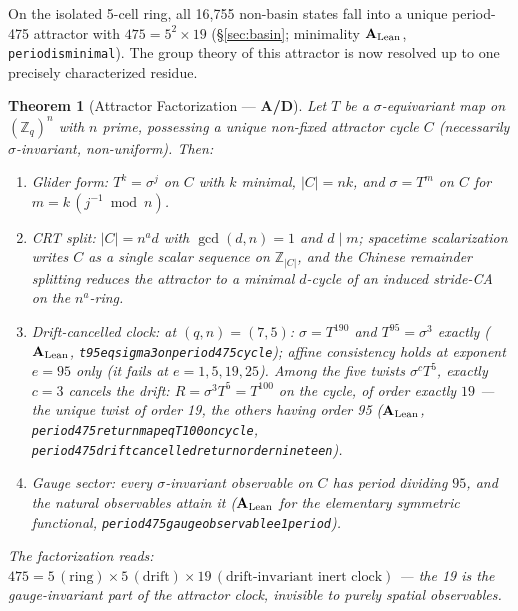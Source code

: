 \documentclass[11pt]{article}
\newtheorem{theorem}{Theorem}[section]
\theoremstyle{remark}
\newcommand{\lean}[1]{%
  \penalty-100
  \begingroup\def\_{\textunderscore\allowbreak}\texttt{#1}\endgroup}
\newcommand{\CatAL}{\texorpdfstring{\ensuremath{\textbf{A}_{\rm Lean}}}{A-Lean}}
\newcommand{\CatAD}{\textbf{A/D}}
\begin{document}
On the isolated 5-cell ring, all 16{,}755 non-basin states fall into a
unique period-475 attractor with $475 = 5^2 \times 19$
(§\ref{sec:basin}; minimality \CatAL{}, \lean{period\_475\_is\_minimal}).
The group theory of this attractor is now resolved up to one precisely
characterized residue.

\begin{theorem}[Attractor Factorization --- \CatAD{}]
\label{thm:attractorfactorization}
Let $T$ be a $\sigma$-equivariant map on $(\mathbb{Z}_q)^n$ with $n$
prime, possessing a unique non-fixed attractor cycle $C$ (necessarily
$\sigma$-invariant, non-uniform). Then:
\begin{enumerate}[leftmargin=2em,itemsep=2pt,topsep=2pt,label=(\roman*)]
  \item \emph{Glider form:} $T^k = \sigma^j$ on $C$ with $k$ minimal,
    $|C| = nk$, and $\sigma = T^{m}$ on $C$ for $m = k\,(j^{-1} \bmod n)$.
  \item \emph{CRT split:} $|C| = n^a d$ with $\gcd(d, n) = 1$ and
    $d \mid m$; spacetime scalarization writes $C$ as a single scalar
    sequence on $\mathbb{Z}_{|C|}$, and the Chinese remainder splitting
    reduces the attractor to a minimal $d$-cycle of an induced stride-CA
    on the $n^a$-ring.
  \item \emph{Drift-cancelled clock:} at $(q, n) = (7, 5)$:
    $\sigma = T^{190}$ and $T^{95} = \sigma^3$ exactly (\CatAL{},
    \lean{t95\_eq\_sigma3\_on\_period475\_cycle}); affine consistency
    holds at exponent $e = 95$ only (it fails at $e = 1, 5, 19, 25$).
    Among the five twists $\sigma^c T^5$, exactly $c = 3$ cancels the
    drift: $R = \sigma^3 T^5 = T^{100}$ on the cycle, of order exactly
    $19$ --- the unique twist of order 19, the others having order 95
    (\CatAL{}, \lean{period475\_return\_map\_eq\_T100\_on\_cycle},
    \lean{period475\_drift\_cancelled\_return\_order\_nineteen}).
  \item \emph{Gauge sector:} every $\sigma$-invariant observable on $C$
    has period dividing $95$, and the natural observables attain it
    (\CatAL{} for the elementary symmetric functional,
    \lean{period475\_gauge\_observable\_e1\_period\_95}).
\end{enumerate}
The factorization reads: $475 = 5\,(\text{ring}) \times 5\,(\text{drift})
\times 19\,(\text{drift-invariant inert clock})$ --- the 19 is the
gauge-invariant part of the attractor clock, invisible to purely spatial
observables.
\end{theorem}
\end{document}
